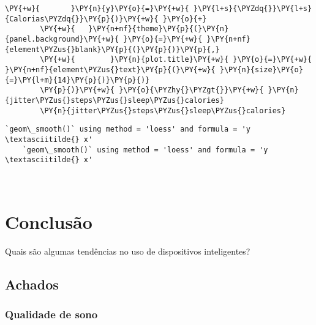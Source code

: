 \begin{tcolorbox}[breakable, size=fbox, boxrule=1pt, pad at break*=1mm,colback=cellbackground, colframe=cellborder]
\begin{Verbatim}[commandchars=\\\{\}]
        \PY{+w}{       }\PY{n}{y}\PY{o}{=}\PY{+w}{ }\PY{l+s}{\PYZdq{}}\PY{l+s}{Calorias\PYZdq{}}\PY{p}{)}\PY{+w}{ }\PY{o}{+}
        \PY{+w}{   }\PY{n+nf}{theme}\PY{p}{(}\PY{n}{panel.background}\PY{+w}{ }\PY{o}{=}\PY{+w}{ }\PY{n+nf}{element\PYZus{}blank}\PY{p}{(}\PY{p}{)}\PY{p}{,}
        \PY{+w}{        }\PY{n}{plot.title}\PY{+w}{ }\PY{o}{=}\PY{+w}{ }\PY{n+nf}{element\PYZus{}text}\PY{p}{(}\PY{+w}{ }\PY{n}{size}\PY{o}{=}\PY{l+m}{14}\PY{p}{)}\PY{p}{)}
        \PY{p}{)}\PY{+w}{ }\PY{o}{\PYZhy{}\PYZgt{}}\PY{+w}{ }\PY{n}{jitter\PYZus{}steps\PYZus{}sleep\PYZus{}calories}
        \PY{n}{jitter\PYZus{}steps\PYZus{}sleep\PYZus{}calories}
    \end{Verbatim}
\end{tcolorbox}

\begin{Verbatim}[commandchars=\\\{\}]
    `geom\_smooth()` using method = 'loess' and formula = 'y \textasciitilde{} x'
    `geom\_smooth()` using method = 'loess' and formula = 'y \textasciitilde{} x'
\end{Verbatim}

\begin{center}
\end{center}
{ \hspace*{\fill} \\}

\section{Conclusão}

Quais são algumas tendências no uso de dispositivos inteligentes?

\subsection{Achados}

\subsubsection{Qualidade de sono}

